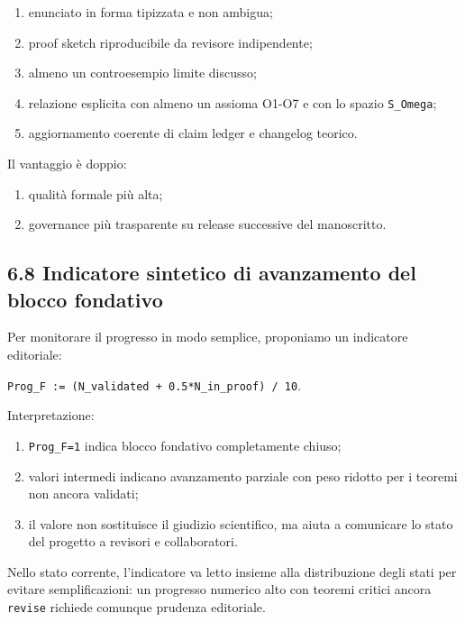 \begin{enumerate}
\def\labelenumi{\arabic{enumi}.}
\tightlist
\item
  enunciato in forma tipizzata e non ambigua;
\item
  proof sketch riproducibile da revisore indipendente;
\item
  almeno un controesempio limite discusso;
\item
  relazione esplicita con almeno un assioma O1-O7 e con lo spazio \texttt{S\_Omega};
\item
  aggiornamento coerente di claim ledger e changelog teorico.
\end{enumerate}

Il vantaggio è doppio:

\begin{enumerate}
\def\labelenumi{\arabic{enumi}.}
\tightlist
\item
  qualità formale più alta;
\item
  governance più trasparente su release successive del manoscritto.
\end{enumerate}

\subsection{6.8 Indicatore sintetico di avanzamento del blocco fondativo}

Per monitorare il progresso in modo semplice, proponiamo un indicatore editoriale:

\texttt{Prog\_F\ :=\ (N\_validated\ +\ 0.5*N\_in\_proof)\ /\ 10}.

Interpretazione:

\begin{enumerate}
\def\labelenumi{\arabic{enumi}.}
\tightlist
\item
  \texttt{Prog\_F=1} indica blocco fondativo completamente chiuso;
\item
  valori intermedi indicano avanzamento parziale con peso ridotto per i teoremi non ancora validati;
\item
  il valore non sostituisce il giudizio scientifico, ma aiuta a comunicare lo stato del progetto a revisori e collaboratori.
\end{enumerate}

Nello stato corrente, l'indicatore va letto insieme alla distribuzione degli stati per evitare semplificazioni: un progresso numerico alto con teoremi critici ancora \texttt{revise} richiede comunque prudenza editoriale.


